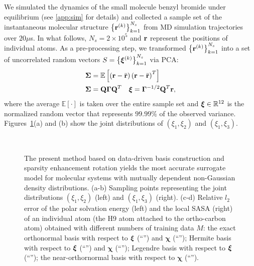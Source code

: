 We simulated the dynamics of the small molecule benzyl bromide under equilibrium (see \ref{app:sim} for details) and collected a sample set of the instantaneous molecular structure  $\left\{\mathbf r^{(k)}\right\}_{k=1}^{N_s}$ from \ac{MD} simulation trajectories over $20 \mu$s.
In what follows, $N_s = 2\times 10^5$ and $\mathbf r$ represent the positions of individual atoms.
As a pre-processing step, we transformed $\left\{\mathbf r^{(k)}\right\}_{k=1}^{N_s}$ into a set of uncorrelated random vectors $S = \left\{\mathbf {\bm\xi}^{(k)}\right\}_{k=1}^{N_s}$ via \ac{PCA}: 
\begin{equation}
  \begin{split}
    &\bm\Sigma = \mathbb{E}\left[\left(\mathbf r - \bar {\mathbf r}\right) \left(\mathbf r - \bar {\mathbf r}\right)^T\right] \\
    &\bm\Sigma = \mathbf Q \bm \Gamma \mathbf Q^T \quad \bm\xi = \bm \Gamma^{-1/2}\mathbf Q^T\mathbf r,
  \end{split}
\end{equation}
where the average $\mathbb{E}[\cdot]$ is taken over the entire sample set and $\bm\xi \in \mathbb{R}^{12}$ is the normalized random vector that represents $99.99\%$
of the {observed variance}. 
Figures~\ref{fig:err_mol_dim_12_p_4}(a) and (b) show the joint distributions of $\left(\xi_1,\xi_2\right)$ and $\left(\xi_1,\xi_3\right)$.
\begin{figure}[tbp]
  \center
   \\
  \caption{{The present method based on data-driven basis construction and sparsity 
    enhancement rotation yields the most accurate surrogate
  model for molecular systems with mutually dependent non-Gaussian density distributions.} 
  (a-b) Sampling points representing the joint distributions $\left(\xi_1, \xi_2\right)$ (left) and $\left(\xi_1, \xi_3\right)$ (right).
  (c-d) Relative $l_2$ error of the polar solvation energy (left) and the local \ac{SASA} (right) of an individual atom
  (the H9 atom attached to the ortho-carbon atom) obtained with different numbers of training data $M$:
  the exact  orthonormal basis with respect to $\bm\xi$ 
    (``\textcolor{red}{\protect\rectanglesolidline}'') and 
  $\bm\chi$ (``\textcolor{red}{\protect\rectangledashline}''); 
  Hermite basis with respect to $\bm\xi$ (``\textcolor{gray}{\protect\downtrianglesolidline}'')
  and $\bm\chi$ (``\textcolor{gray}{\protect\downtriangledashline}'');
  Legendre basis with respect to $\bm\xi$ (``\textcolor{blue}{\protect\diamondsolidline}'');
  the near-orthornormal  basis with respect to $\bm\chi$ (``\textcolor{green}{\protect\triangledashline}'').
  } \label{fig:err_mol_dim_12_p_4}
\end{figure}
